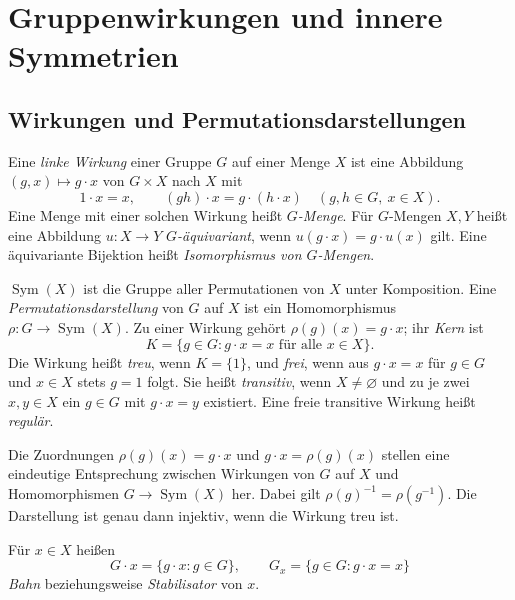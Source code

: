 \chapter{Gruppenwirkungen und innere Symmetrien}

\section{Wirkungen und Permutationsdarstellungen}

\begin{definition}
\label{b40guide:def:action}
Eine \emph{linke Wirkung} einer Gruppe $G$ auf einer Menge $X$ ist eine
Abbildung $(g,x)\mapsto g\cdot x$ von $G\times X$ nach $X$ mit
\[
 1\cdot x=x,\qquad (gh)\cdot x=g\cdot(h\cdot x)
 \quad(g,h\in G,\ x\in X).
\]
Eine Menge mit einer solchen Wirkung heißt \emph{$G$-Menge}.
Für $G$-Mengen $X,Y$ heißt eine Abbildung $u:X\to Y$
\emph{$G$-äquivariant}, wenn $u(g\cdot x)=g\cdot u(x)$ gilt.
Eine äquivariante Bijektion heißt \emph{Isomorphismus von $G$-Mengen}.
\end{definition}

\begin{definition}
\label{b40guide:def:permutation-representation}
$\operatorname{Sym}(X)$ ist die Gruppe aller Permutationen von $X$
unter Komposition. Eine \emph{Permutationsdarstellung} von $G$ auf $X$
ist ein Homomorphismus $\rho:G\to\operatorname{Sym}(X)$.
Zu einer Wirkung gehört $\rho(g)(x)=g\cdot x$; ihr \emph{Kern} ist
\[
 K=\{g\in G:g\cdot x=x\text{ für alle }x\in X\}.
\]
Die Wirkung heißt \emph{treu}, wenn $K=\{1\}$, und \emph{frei}, wenn
aus $g\cdot x=x$ für $g\in G$ und $x\in X$ stets $g=1$ folgt.
Sie heißt \emph{transitiv}, wenn $X\ne\varnothing$ und zu je zwei
$x,y\in X$ ein $g\in G$ mit $g\cdot x=y$ existiert.
Eine freie transitive Wirkung heißt \emph{regulär}.
\end{definition}

\begin{theorem}
\label{b40guide:thm:action-representation}
Die Zuordnungen $\rho(g)(x)=g\cdot x$ und $g\cdot x=\rho(g)(x)$
stellen eine eindeutige Entsprechung zwischen Wirkungen von $G$ auf $X$
und Homomorphismen $G\to\operatorname{Sym}(X)$ her.
Dabei gilt $\rho(g)^{-1}=\rho(g^{-1})$.
Die Darstellung ist genau dann injektiv, wenn die Wirkung treu ist.
\cite{milne}
\end{theorem}

\begin{definition}
\label{b40guide:def:orbit-stabilizer}
Für $x\in X$ heißen
\[
 G\cdot x=\{g\cdot x:g\in G\},\qquad
 G_x=\{g\in G:g\cdot x=x\}
\]
\emph{Bahn} beziehungsweise \emph{Stabilisator} von $x$.
\end{definition}

